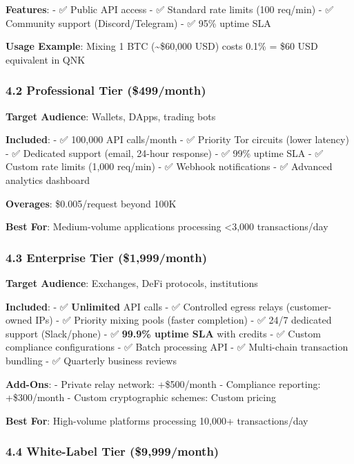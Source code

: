 \documentclass[
  11pt,
]{article}
\begin{document}
\textbf{Features}: - ✅ Public API access - ✅ Standard rate limits (100
req/min) - ✅ Community support (Discord/Telegram) - ✅ 95\% uptime SLA

\textbf{Usage Example}: Mixing 1 BTC (\textasciitilde\$60,000 USD) costs
0.1\% = \$60 USD equivalent in QNK

\hypertarget{professional-tier-499month}{%
\subsubsection{4.2 Professional Tier
(\$499/month)}\label{professional-tier-499month}}

\textbf{Target Audience}: Wallets, DApps, trading bots

\textbf{Included}: - ✅ 100,000 API calls/month - ✅ Priority Tor
circuits (lower latency) - ✅ Dedicated support (email, 24-hour
response) - ✅ 99\% uptime SLA - ✅ Custom rate limits (1,000 req/min) -
✅ Webhook notifications - ✅ Advanced analytics dashboard

\textbf{Overages}: \$0.005/request beyond 100K

\textbf{Best For}: Medium-volume applications processing \textless3,000
transactions/day

\hypertarget{enterprise-tier-1999month}{%
\subsubsection{4.3 Enterprise Tier
(\$1,999/month)}\label{enterprise-tier-1999month}}

\textbf{Target Audience}: Exchanges, DeFi protocols, institutions

\textbf{Included}: - ✅ \textbf{Unlimited} API calls - ✅ Controlled
egress relays (customer-owned IPs) - ✅ Priority mixing pools (faster
completion) - ✅ 24/7 dedicated support (Slack/phone) - ✅
\textbf{99.9\% uptime SLA} with credits - ✅ Custom compliance
configurations - ✅ Batch processing API - ✅ Multi-chain transaction
bundling - ✅ Quarterly business reviews

\textbf{Add-Ons}: - Private relay network: +\$500/month - Compliance
reporting: +\$300/month - Custom cryptographic schemes: Custom pricing

\textbf{Best For}: High-volume platforms processing 10,000+
transactions/day

\hypertarget{white-label-tier-9999month}{%
\subsubsection{4.4 White-Label Tier
(\$9,999/month)}\label{white-label-tier-9999month}}
\end{document}
